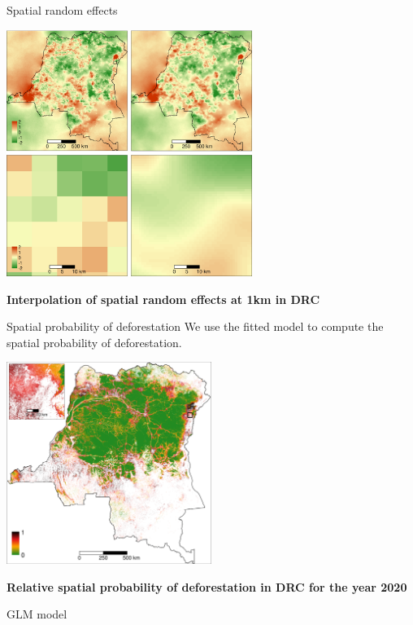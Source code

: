 \documentclass[10pt,table,dvipsnames,compress]{beamer}
\begin{document}
\begin{frame}[label={sec:orgbafa8c3}]{Spatial random effects}
\begin{center}
\includegraphics[width=0.6\textwidth]{figs/sm/rho.png}
\end{center}

\textbf{Interpolation of spatial random effects at 1km in DRC}
\end{frame}

\begin{frame}[label={sec:org6d7004f}]{Spatial probability of deforestation}
We use the fitted model to compute the spatial probability of
deforestation.

\begin{center}
\includegraphics[width=0.5\textwidth]{figs/sm/prob.png}
\end{center}

\textbf{Relative spatial probability of deforestation in DRC for the year 2020}
\end{frame}

\begin{frame}[label={sec:org31c88ab}]{GLM model}
\end{frame}
\end{document}
